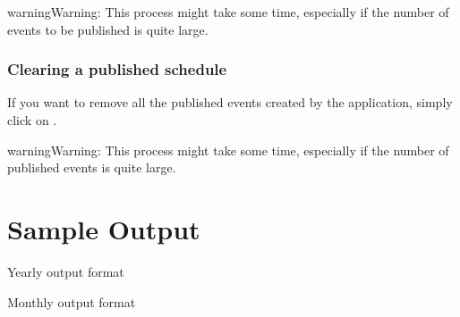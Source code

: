 \documentclass[letterpaper,10pt,english]{sphinxmanual}
\begin{document}
\begin{figure}[H]
\centering
{}\end{figure}

\begin{sphinxadmonition}{warning}{Warning:}
This process might take some time, especially if the number of events
to be published is quite large.
\end{sphinxadmonition}


\subsection{Clearing a published schedule}
\label{\detokenize{manual:clearing-a-published-schedule}}
If you want to remove all the published events created by the application,
simply click on .

\begin{figure}[H]
\centering
{}\end{figure}

\begin{sphinxadmonition}{warning}{Warning:}
This process might take some time, especially if the number of published
events is quite large.
\end{sphinxadmonition}


\chapter{Sample Output}
\label{\detokenize{manual:sample-output}}
Yearly output format

\begin{figure}[H]
\centering
{}\end{figure}

Monthly output format

\begin{figure}[H]
\centering
{}\end{figure}



\renewcommand{\indexname}{Index}
\printindex
\end{document}

